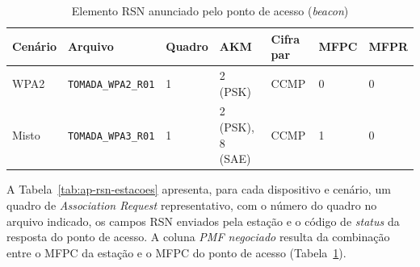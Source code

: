 \begin{table}[htbp]
\centering
\caption{Elemento RSN anunciado pelo ponto de acesso (\textit{beacon})}
\label{tab:ap-rsn-ap}
\small
\setlength{\tabcolsep}{4pt}
\begin{tabular}{|p{}|p{}|p{}|p{}|p{}|p{}|p{}|}
\hline
\textbf{Cenário} & \textbf{Arquivo} & \textbf{Quadro} & \textbf{AKM} & \textbf{Cifra par} & \textbf{MFPC} & \textbf{MFPR} \\ \hline
WPA2 & \texttt{TOMADA\_WPA2\_R01} & 1 & 2 (PSK) & CCMP & 0 & 0 \\ \hline
Misto & \texttt{TOMADA\_WPA3\_R01} & 1 & 2 (PSK), 8 (SAE) & CCMP & 1 & 0 \\ \hline
\end{tabular}
\end{table}

A Tabela~\ref{tab:ap-rsn-estacoes} apresenta, para cada dispositivo e cenário, um quadro de \textit{Association Request} representativo, com o número do quadro no arquivo indicado, os campos RSN enviados pela estação e o código de \textit{status} da resposta do ponto de acesso. A coluna \textit{PMF negociado} resulta da combinação entre o MFPC da estação e o MFPC do ponto de acesso (Tabela~\ref{tab:ap-rsn-ap}).

